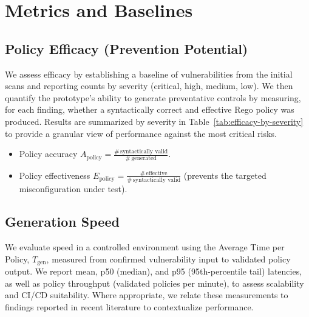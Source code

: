 \section{Metrics and Baselines}\label{sec:metrics-and-baselines}

\subsection{Policy Efficacy (Prevention Potential)}\label{sec:metrics-efficacy}

We assess efficacy by establishing a baseline of vulnerabilities from the initial scans and reporting counts by severity (critical, high, medium, low). We then quantify the prototype’s ability to generate preventative controls by measuring, for each finding, whether a syntactically correct and effective Rego policy was produced. Results are summarized by severity in Table~\ref{tab:efficacy-by-severity} to provide a granular view of performance against the most critical risks.

\begin{itemize}
	\item Policy accuracy $A_{\text{policy}} = \frac{\#\,\text{syntactically valid}}{\#\,\text{generated}}$.
	\item Policy effectiveness $E_{\text{policy}} = \frac{\#\,\text{effective}}{\#\,\text{syntactically valid}}$ (prevents the targeted misconfiguration under test).
\end{itemize}

\subsection{Generation Speed}\label{sec:metrics-speed}

We evaluate speed in a controlled environment using the Average Time per Policy, $T_{\text{gen}}$, measured from confirmed vulnerability input to validated policy output. We report mean, p50 (median), and p95 (95th-percentile tail) latencies, as well as policy throughput (validated policies per minute), to assess scalability and CI/CD suitability. Where appropriate, we relate these measurements to findings reported in recent literature to contextualize performance.

